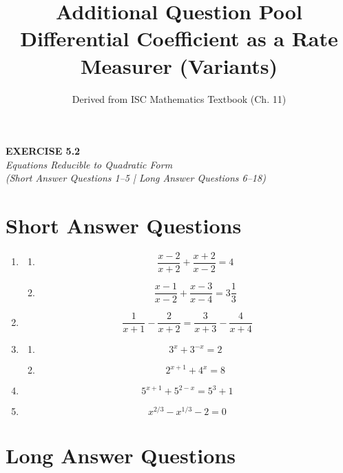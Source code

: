 \documentclass[12pt,a4paper]{article}
\title{\textbf{Additional Question Pool}\\[0.5em]
	\large Differential Coefficient as a Rate Measurer (Variants)}
\author{Derived from ISC Mathematics Textbook (Ch. 11)}
\date{}
\begin{document}
	
	\begin{center}
		\Large\textbf{EXERCISE 5.2}\\[0.3cm]
		\normalsize\textit{Equations Reducible to Quadratic Form}\\[0.2cm]
		\small\textit{(Short Answer Questions 1--5 | Long Answer Questions 6--18)}
	\end{center}
	
	\vspace{0.4cm}
	
	\section*{Short Answer Questions}
	
	\begin{enumerate}[label=\textbf{\arabic*.}, leftmargin=1.8em]
		\item 
		\begin{enumerate}[label=(\roman*), leftmargin=2.2em]
			\item \[\frac{x-2}{x+2} + \frac{x+2}{x-2} = 4\]
			\item \[\frac{x-1}{x-2} + \frac{x-3}{x-4} = 3\frac{1}{3}\]
		\end{enumerate}
		
		\item 
		\[\frac{1}{x+1} - \frac{2}{x+2} = \frac{3}{x+3} - \frac{4}{x+4}\]
		
		\item 
		\begin{enumerate}[label=(\roman*), leftmargin=2.2em]
			\item \[3^{x} + 3^{-x} = 2\]
			\item \[2^{x+1} + 4^{x} = 8\]
		\end{enumerate}
		
		\item 
		\[5^{x+1} + 5^{2-x} = 5^{3} + 1\]
		
		\item 
		\[x^{2/3} - x^{1/3} - 2 = 0\]
	\end{enumerate}
	
	\vspace{0.5cm}
	\section*{Long Answer Questions}
	
\end{document}
